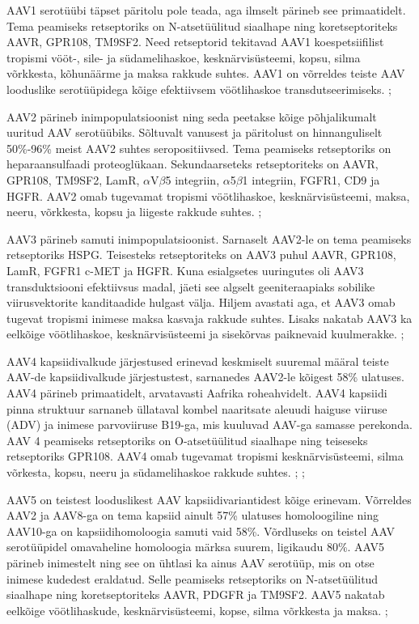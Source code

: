 \documentclass{trkut}%
\begin{document}
AAV1 serotüübi täpset päritolu pole teada, aga ilmselt pärineb see primaatidelt. Tema peamiseks retseptoriks on N-atsetüülitud siaalhape ning koretseptoriteks AAVR, GPR108, TM9SF2. Need retseptorid tekitavad AAV1 koespetsiifilist tropismi vööt-, sile- ja südamelihaskoe, kesknärvisüsteemi, kopsu, silma võrkkesta, kõhunäärme ja maksa rakkude suhtes. AAV1 on võrreldes teiste AAV looduslike serotüüpidega kõige efektiivsem vöötlihaskoe transdutseerimiseks. \parencite{pupo}; \parencite{serotüübid}

AAV2 pärineb inimpopulatsioonist ning seda peetakse kõige põhjalikumalt uuritud AAV serotüübiks. Sõltuvalt vanusest ja päritolust on hinnanguliselt 50\%-96\% meist AAV2 suhtes seropositiivsed. Tema peamiseks retseptoriks on heparaansulfaadi proteoglükaan. Sekundaarseteks retseptoriteks on AAVR, GPR108, TM9SF2, LamR, $\alpha$V$\beta$5 integriin, $\alpha$5$\beta$1 integriin, FGFR1, CD9 ja HGFR. AAV2 omab tugevamat tropismi vöötlihaskoe, kesknärvisüsteemi, maksa, neeru, võrkkesta, kopsu ja liigeste rakkude suhtes. \parencite{pupo}; \parencite{serotüübid}

AAV3 pärineb samuti inimpopulatsioonist. Sarnaselt AAV2-le on tema peamiseks retseptoriks HSPG. Teisesteks retseptoriteks on AAV3 puhul AAVR, GPR108, LamR, FGFR1 c-MET ja HGFR. Kuna esialgsetes uuringutes oli AAV3 transduktsiooni efektiivsus madal, jäeti see algselt geeniteraapiaks sobilike viirusvektorite kanditaadide hulgast välja. Hiljem avastati aga, et AAV3 omab tugevat tropismi inimese maksa kasvaja rakkude suhtes. Lisaks nakatab AAV3 ka eelkõige vöötlihaskoe, kesknärvisüsteemi ja sisekõrvas paiknevaid kuulmerakke. \parencite{pupo}; \parencite{serotüübid}

AAV4 kapsiidivalkude järjestused erinevad keskmiselt suuremal määral teiste AAV-de kapsiidivalkude järjestustest, sarnanedes AAV2-le kõigest 58\% ulatuses. AAV4 pärineb primaatidelt, arvatavasti Aafrika roheahvidelt. AAV4 kapsiidi pinna struktuur sarnaneb üllataval kombel naaritsate aleuudi haiguse viiruse (ADV) ja inimese parvoviiruse B19-ga, mis kuuluvad AAV-ga samasse perekonda. AAV 4 peamiseks retseptoriks on O-atsetüülitud siaalhape ning teiseseks retseptoriks GPR108. AAV4 omab tugevamat tropismi kesknärvisüsteemi, silma võrkesta, kopsu, neeru ja südamelihaskoe rakkude suhtes. \parencite{aav4}; \parencite{pupo}; \parencite{serotüübid}

AAV5 on teistest looduslikest AAV kapsiidivariantidest kõige erinevam. Võrreldes AAV2 ja AAV8-ga on tema kapsiid ainult 57\% ulatuses homoloogiline ning AAV10-ga on kapsiidihomoloogia samuti vaid 58\%. Võrdluseks on teistel AAV serotüüpidel omavaheline homoloogia märksa suurem, ligikaudu 80\%. AAV5 pärineb inimestelt ning see on ühtlasi ka ainus AAV serotüüp, mis on otse inimese kudedest eraldatud. Selle peamiseks retseptoriks on N-atsetüülitud siaalhape ning koretseptoriteks AAVR, PDGFR ja TM9SF2. AAV5 nakatab eelkõige vöötlihaskude, kesknärvisüsteemi, kopse, silma võrkkesta ja maksa. \parencite{pupo}; \parencite{serotüübid}
\end{document}
